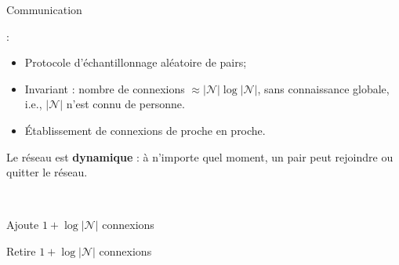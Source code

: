 \begin{frame}{Communication}{\SPRAY}

  \SPRAY :
  \begin{itemize}
  \item Protocole d'échantillonnage aléatoire de pairs;
    \vspace{0.25cm}
  \item Invariant : nombre de connexions
    $\approx |\mathcal{N}| \log |\mathcal{N}|$, sans connaissance globale, i.e.,
    $|\mathcal{N}|$ n'est connu de personne.
    \vspace{0.25cm}
  \item Établissement de connexions de proche en proche.
  \end{itemize}
    
  \vspace{1cm}

  Le réseau est \textbf{dynamique} : à n'importe quel moment, un pair peut
  rejoindre ou quitter le réseau. \\
  
  \vspace{1cm}

  \begin{minipage}{0.32\textwidth}
    \begin{center}
      
    \end{center}
  \end{minipage}
  \begin{minipage}{0.32\textwidth}
    \begin{center}
      \\
    \end{center}
  \end{minipage}
  \begin{minipage}{0.32\textwidth}
    \begin{center}
      
    \end{center}
  \end{minipage}

  \vspace{0.15cm}

  \begin{minipage}{0.32\textwidth}
    \begin{center}
      \small Ajoute $1+\log |\mathcal{N}|$ connexions
    \end{center}
  \end{minipage}
  \begin{minipage}{0.32\textwidth}
    \begin{center}
    \end{center}
  \end{minipage}
  \begin{minipage}{0.32\textwidth}
    \begin{center}
      \small Retire $1+\log |\mathcal{N}|$ connexions
    \end{center}
  \end{minipage}

\end{frame}


